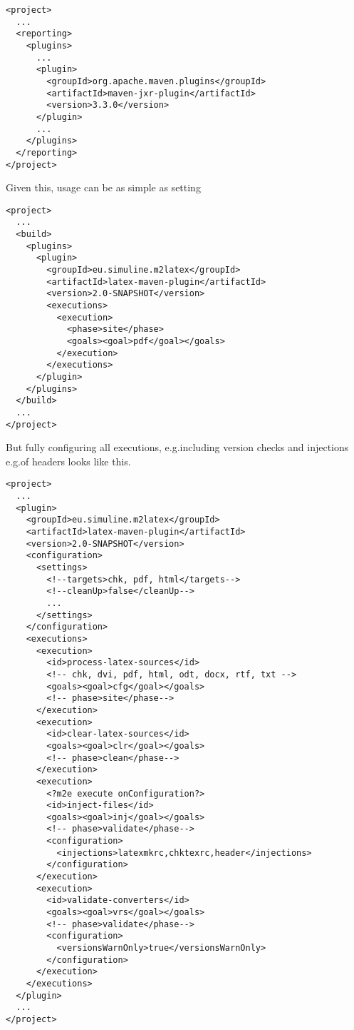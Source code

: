 \documentclass[a4paper,notumble,10pt,english]{leaflet}%
\begin{document}
\begin{Verbatim}[fontsize=\scriptsize]
<project>
  ...
  <reporting>
    <plugins>
      ...
      <plugin>
        <groupId>org.apache.maven.plugins</groupId>
        <artifactId>maven-jxr-plugin</artifactId>
        <version>3.3.0</version>
      </plugin>
      ...
    </plugins>
  </reporting>
</project>
\end{Verbatim}

  Given this, usage can be as simple as setting 


  
\begin{Verbatim}[fontsize=\scriptsize]
<project>
  ...
  <build>
    <plugins>
      <plugin>
        <groupId>eu.simuline.m2latex</groupId>
        <artifactId>latex-maven-plugin</artifactId>
        <version>2.0-SNAPSHOT</version>
        <executions>
          <execution>
            <phase>site</phase>
            <goals><goal>pdf</goal></goals>
          </execution>
        </executions>
      </plugin>
    </plugins>
  </build>
  ...
</project>
\end{Verbatim}


But fully configuring all executions, 
e.g.\@ including version checks and injections 
e.g.\@ of headers looks like this. 


\begin{Verbatim}[fontsize=\scriptsize]
<project>
  ...
  <plugin>
    <groupId>eu.simuline.m2latex</groupId>
    <artifactId>latex-maven-plugin</artifactId>
    <version>2.0-SNAPSHOT</version>
    <configuration>
      <settings>
        <!--targets>chk, pdf, html</targets-->
        <!--cleanUp>false</cleanUp-->
        ...
      </settings>
    </configuration>
    <executions>
      <execution>
        <id>process-latex-sources</id>
        <!-- chk, dvi, pdf, html, odt, docx, rtf, txt -->
        <goals><goal>cfg</goal></goals>
        <!-- phase>site</phase-->
      </execution>
      <execution>
        <id>clear-latex-sources</id>
        <goals><goal>clr</goal></goals>
        <!-- phase>clean</phase-->
      </execution>
      <execution>
        <?m2e execute onConfiguration?>
        <id>inject-files</id>
        <goals><goal>inj</goal></goals>
        <!-- phase>validate</phase-->
        <configuration>
          <injections>latexmkrc,chktexrc,header</injections>
        </configuration>
      </execution>
      <execution>
        <id>validate-converters</id>
        <goals><goal>vrs</goal></goals>
        <!-- phase>validate</phase-->
        <configuration>
          <versionsWarnOnly>true</versionsWarnOnly>
        </configuration>
      </execution>
    </executions>
  </plugin>
  ...
</project>
\end{Verbatim}
\end{document}
